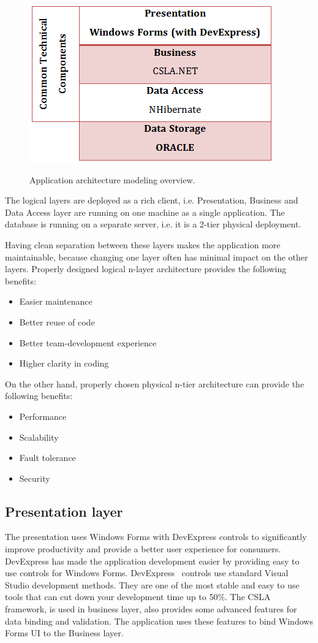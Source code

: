 \begin{figure}[ht]\centering
	\includegraphics[width=.67\textwidth]{pic_layers.PNG}\label{fig_layers}
	\caption{Application architecture modeling overview.}
\end{figure}

\par
The logical layers are deployed as a rich client, i.e. Presentation, Business and Data Access layer are running on one machine as a single application. The database is running on a separate server, i.e. it is a 2-tier physical deployment.
\par
Having clean separation between these layers makes the application more maintainable, because changing one layer often has minimal impact on the other layers. Properly designed logical n-layer architecture provides the following benefits: 
\begin{itemize}
	\item Easier maintenance
	\item Better reuse of code
	\item Better team-development experience
	\item Higher clarity in coding
\end{itemize}

\par
On the other hand, properly chosen physical n-tier architecture can provide the following benefits:
\begin{itemize}
	\item Performance
	\item Scalability
	\item Fault tolerance
	\item Security
\end{itemize}
%

\subsection{Presentation layer}
The presentation uses Windows Forms with DevExpress controls to significantly improve productivity and provide a better user experience for consumers. DevExpress has made the application development easier by providing easy to use controls for Windows Forms. DevExpress~\cite{DED} controls use standard Visual Studio development methods. They are one of the most stable and easy to use tools that can cut down your development time up to 50\%. The CSLA framework, is used in business layer, also provides some advanced features for data binding and validation. The application uses these features to bind Windows Forms UI to the Business layer.
%

